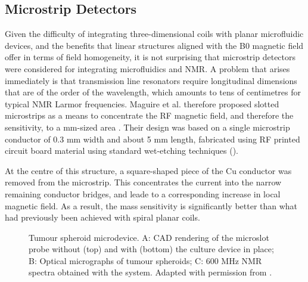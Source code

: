 \subsection{Microstrip Detectors}
Given the difficulty of integrating three-dimensional coils with planar
microfluidic devices, and the benefits that linear structures aligned
with the B0 magnetic field offer in terms of field homogeneity, it is
not surprising that microstrip detectors were considered for integrating
microfluidics and NMR. A problem that arises immediately is that
transmission line resonators require longitudinal dimensions that are of
the order of the wavelength, which amounts to tens of centimetres for
typical NMR Larmor frequencies. Maguire et al. therefore proposed
slotted microstrips as a means to concentrate the RF magnetic field, and
therefore the sensitivity, to a mm-sized area
\cite{Maguire:2009wc,Maguire:2007ko}. Their design was based on a single
microstrip conductor of 0.3 mm width and about 5 mm length, fabricated
using RF printed circuit board material using standard wet-etching
techniques ().

At the centre of this structure, a square-shaped piece of
the Cu conductor was removed from the microstrip. This concentrates the
current into the narrow remaining conductor bridges, and leade to a
corresponding increase in local magnetic field. As a result, the mass
sensitivity is significantly better than what had previously been achieved
with spiral planar coils. 

\begin{figure}
	\begin{center}
	\end{center}
	\caption{Tumour spheroid microdevice. A: CAD rendering of the microslot probe without (top) and with
	(bottom) the culture device in place; B: Optical micrographs of tumour spheroids; C: 600 MHz  NMR
	spectra obtained with the system. Adapted with permission from \cite{Kalfe:2015ik}.}
	\label{fig-Kalfe-2015ik}
\end{figure}

